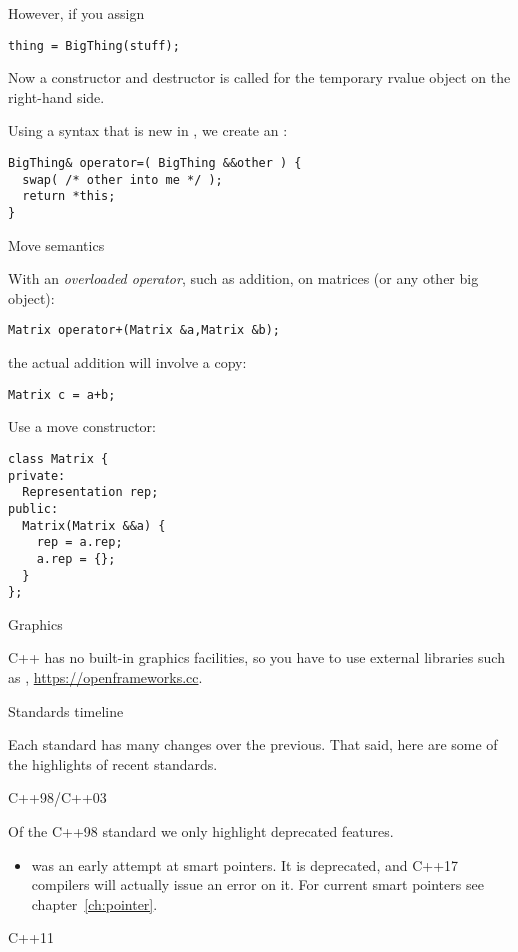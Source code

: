 However, if you assign
\begin{lstlisting}
thing = BigThing(stuff);
\end{lstlisting}
Now a constructor and destructor is called for the temporary rvalue object on
the right-hand side.

Using a syntax that is new in , we create an
:
\begin{lstlisting}
BigThing& operator=( BigThing &&other ) {
  swap( /* other into me */ );
  return *this;
}
\end{lstlisting}

 {Move semantics}

With an
\emph{overloaded operator},
such as addition,
on matrices (or any other big object):
\begin{lstlisting}
Matrix operator+(Matrix &a,Matrix &b);
\end{lstlisting}
the actual addition will involve a copy:
\begin{lstlisting}
Matrix c = a+b;
\end{lstlisting}

Use a move constructor:
\begin{lstlisting}
class Matrix {
private:
  Representation rep;
public:
  Matrix(Matrix &&a) {
    rep = a.rep;
    a.rep = {};
  }
};
\end{lstlisting}

 {Graphics}

C++ has no built-in graphics facilities, so you have to use external
libraries such as ,
\url{https://openframeworks.cc}.

 {Standards timeline}
\label{sec:cpp-standards}

Each standard has many changes over the previous. That said, here are
some of the highlights of recent standards.

 {C++98/C++03}

Of the C++98 standard
we only highlight deprecated features.
\begin{itemize}
\item {} was an early attempt at smart
  pointers. It is deprecated, and C++17 compilers will actually issue
  an error on it. For current smart pointers see chapter~\ref{ch:pointer}.
\end{itemize}

 {C++11}

